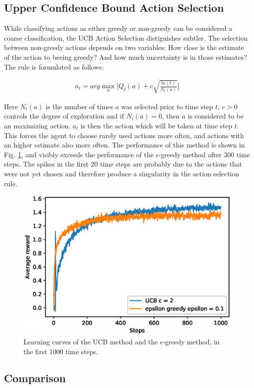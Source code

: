 \documentclass[paper=a4, fontsize=11pt]{scrartcl} %
\numberwithin{equation}{section} %
\numberwithin{figure}{section} %
\numberwithin{table}{section} %
\begin{document}
\subsection{Upper Confidence Bound Action Selection}

	While classifying actions as either greedy or non-greedy can be considered a coarse classification, the UCB Action Selection distiguishes subtler. The selection between non-greedy actions depends on two variables: How close is the estimate of the action to beeing greedy? And how much uncertainty is in those estimates? The rule is formulated as follows:

\begin{align}
a_t = arg \max\limits_{a}  \big[ Q_t (a) + c \sqrt{\frac{ln (t)}{N_t (a)}} \big]
\end{align}

	Here $N_t(a)$ is the number of times $a$ was selected prior to time step $t$, $c > 0$ controls the degree of exploration and if $N_t(a) = 0$, then $a$ is considered to be an maximizing action. $a_t$ is then the action which will be taken at time step $t$. This forces the agent to choose rarely used actions more often, and actions with an higher estimate also more often. The performance of this method is shown in Fig. \ref{fig:UCB}, and visibly exceeds the performance of the $\epsilon$-greedy method after 300 time steps. The spikes in the first 20 time steps are probably due to the actions that were not yet chosen and therefore produce a singularity in the action selection rule. 

\begin{figure}[H]
\centering
\includegraphics[width=0.6\linewidth]{Images/figure_2_4.eps}
\caption{\cite{ShangtongZhang} Learning curves of the  UCB method and the $\epsilon$-greedy method, in the first 1000 time steps.}
\label{fig:UCB}
\end{figure}

\subsection{Comparison}
\end{document}
